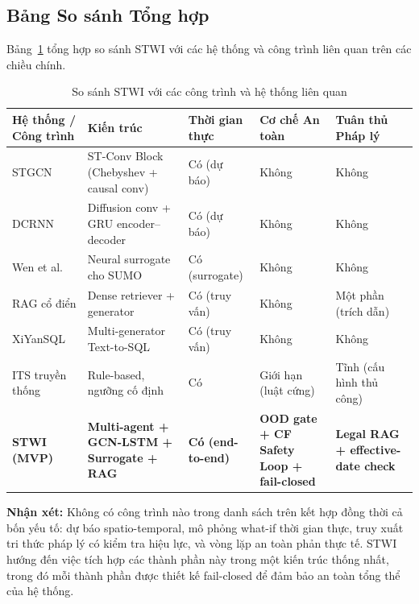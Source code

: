 \subsection{Bảng So sánh Tổng hợp}

Bảng~\ref{tab:related_work_comparison} tổng hợp so sánh STWI với các hệ thống và công trình liên quan trên các chiều chính.

\begin{table}[H]
\centering
\caption{So sánh STWI với các công trình và hệ thống liên quan}
\label{tab:related_work_comparison}
\renewcommand{\arraystretch}{1.4}
\small
\begin{tabular}{p{2.6cm} p{2.8cm} p{2.2cm} p{2.5cm} p{2.5cm}}
\toprule
\textbf{Hệ thống / Công trình} & \textbf{Kiến trúc} & \textbf{Thời gian thực} & \textbf{Cơ chế An toàn} & \textbf{Tuân thủ Pháp lý} \\
\midrule
STGCN \cite{yu2018stgcn} & ST-Conv Block (Chebyshev + causal conv) & Có (dự báo) & Không & Không \\
\rowcolor{rowgray}
DCRNN \cite{li2018diffusion} & Diffusion conv + GRU encoder--decoder & Có (dự báo) & Không & Không \\
Wen et al. \cite{wen2023surrogate} & Neural surrogate cho SUMO & Có (surrogate) & Không & Không \\
\rowcolor{rowgray}
RAG cổ điển \cite{lewis2020rag} & Dense retriever + generator & Có (truy vấn) & Không & Một phần (trích dẫn) \\
XiYanSQL \cite{guo2023xiyansql} & Multi-generator Text-to-SQL & Có (truy vấn) & Không & Không \\
\rowcolor{rowgray}
ITS truyền thống & Rule-based, ngưỡng cố định & Có & Giới hạn (luật cứng) & Tĩnh (cấu hình thủ công) \\
\textbf{STWI (MVP)} & \textbf{Multi-agent + GCN-LSTM + Surrogate + RAG} & \textbf{Có (end-to-end)} & \textbf{OOD gate + CF Safety Loop + fail-closed} & \textbf{Legal RAG + effective-date check} \\
\bottomrule
\end{tabular}
\end{table}

\begin{tcolorbox}[notebox]
\textbf{Nhận xét:} Không có công trình nào trong danh sách trên kết hợp đồng thời cả bốn yếu tố: dự báo spatio-temporal, mô phỏng what-if thời gian thực, truy xuất tri thức pháp lý có kiểm tra hiệu lực, và vòng lặp an toàn phản thực tế. STWI hướng đến việc tích hợp các thành phần này trong một kiến trúc thống nhất, trong đó mỗi thành phần được thiết kế fail-closed để đảm bảo an toàn tổng thể của hệ thống.
\end{tcolorbox}
